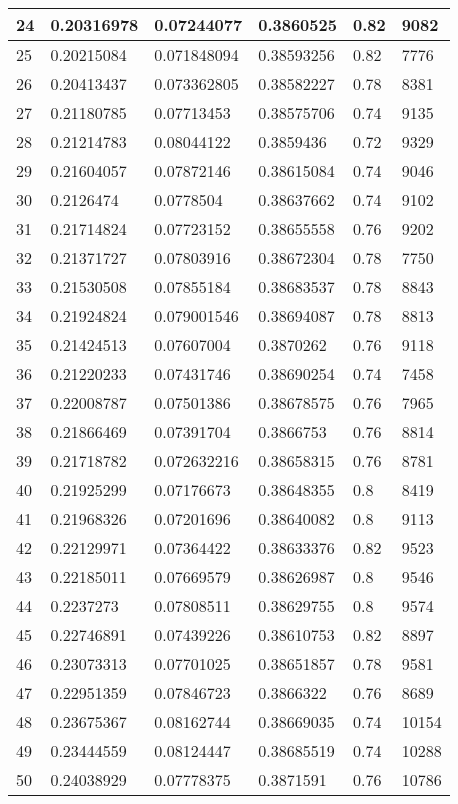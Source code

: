 \begin{longtable}{|l|l|l|l|l|l|}
24 & 0.20316978 & 0.07244077 & 0.3860525 & 0.82 & 9082 \\ \hline 
25 & 0.20215084 & 0.071848094 & 0.38593256 & 0.82 & 7776 \\ \hline 
26 & 0.20413437 & 0.073362805 & 0.38582227 & 0.78 & 8381 \\ \hline 
27 & 0.21180785 & 0.07713453 & 0.38575706 & 0.74 & 9135 \\ \hline 
28 & 0.21214783 & 0.08044122 & 0.3859436 & 0.72 & 9329 \\ \hline 
29 & 0.21604057 & 0.07872146 & 0.38615084 & 0.74 & 9046 \\ \hline 
30 & 0.2126474 & 0.0778504 & 0.38637662 & 0.74 & 9102 \\ \hline 
31 & 0.21714824 & 0.07723152 & 0.38655558 & 0.76 & 9202 \\ \hline 
32 & 0.21371727 & 0.07803916 & 0.38672304 & 0.78 & 7750 \\ \hline 
33 & 0.21530508 & 0.07855184 & 0.38683537 & 0.78 & 8843 \\ \hline 
34 & 0.21924824 & 0.079001546 & 0.38694087 & 0.78 & 8813 \\ \hline 
35 & 0.21424513 & 0.07607004 & 0.3870262 & 0.76 & 9118 \\ \hline 
36 & 0.21220233 & 0.07431746 & 0.38690254 & 0.74 & 7458 \\ \hline 
37 & 0.22008787 & 0.07501386 & 0.38678575 & 0.76 & 7965 \\ \hline 
38 & 0.21866469 & 0.07391704 & 0.3866753 & 0.76 & 8814 \\ \hline 
39 & 0.21718782 & 0.072632216 & 0.38658315 & 0.76 & 8781 \\ \hline 
40 & 0.21925299 & 0.07176673 & 0.38648355 & 0.8 & 8419 \\ \hline 
41 & 0.21968326 & 0.07201696 & 0.38640082 & 0.8 & 9113 \\ \hline 
42 & 0.22129971 & 0.07364422 & 0.38633376 & 0.82 & 9523 \\ \hline 
43 & 0.22185011 & 0.07669579 & 0.38626987 & 0.8 & 9546 \\ \hline 
44 & 0.2237273 & 0.07808511 & 0.38629755 & 0.8 & 9574 \\ \hline 
45 & 0.22746891 & 0.07439226 & 0.38610753 & 0.82 & 8897 \\ \hline 
46 & 0.23073313 & 0.07701025 & 0.38651857 & 0.78 & 9581 \\ \hline 
47 & 0.22951359 & 0.07846723 & 0.3866322 & 0.76 & 8689 \\ \hline 
48 & 0.23675367 & 0.08162744 & 0.38669035 & 0.74 & 10154 \\ \hline 
49 & 0.23444559 & 0.08124447 & 0.38685519 & 0.74 & 10288 \\ \hline 
50 & 0.24038929 & 0.07778375 & 0.3871591 & 0.76 & 10786 \\ \hline 
\end{longtable}